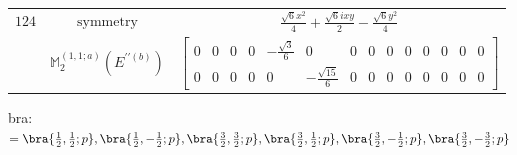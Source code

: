 \documentclass[fleqn,8pt,landscape]{jsarticle}
\begin{document}
\begin{longtable}{ccc}
$ 124 $ & $ \text{symmetry} $ & $ \frac{\sqrt{6} x^{2}}{4} + \frac{\sqrt{6} i x y}{2} - \frac{\sqrt{6} y^{2}}{4} $ \\
$  $ & $ \mathbb{M}_{2}^{(1,1;a)}(E^{\prime\prime(b)}) $ & $ \begin{bmatrix} 0 & 0 & 0 & 0 & - \frac{\sqrt{3}}{6} & 0 & 0 & 0 & 0 & 0 & 0 & 0 & 0 & 0 \\ 0 & 0 & 0 & 0 & 0 & - \frac{\sqrt{15}}{6} & 0 & 0 & 0 & 0 & 0 & 0 & 0 & 0 \end{bmatrix} $ \\ \hline
\end{longtable}
bra: $=\bra{\frac{1}{2},\frac{1}{2};p}, \bra{\frac{1}{2},- \frac{1}{2};p}, \bra{\frac{3}{2},\frac{3}{2};p}, \bra{\frac{3}{2},\frac{1}{2};p}, \bra{\frac{3}{2},- \frac{1}{2};p}, \bra{\frac{3}{2},- \frac{3}{2};p}$
\end{document}
